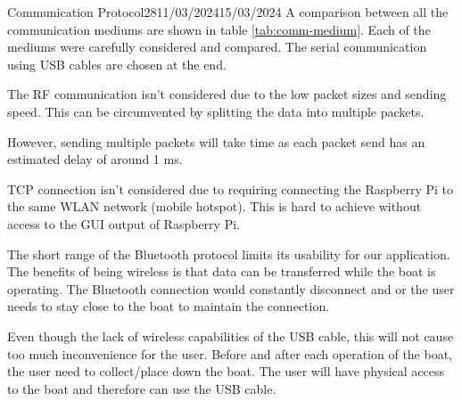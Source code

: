 \documentclass[12pt]{article}
\begin{document}
\begin{logbook-entry}{Communication Protocol}{28}{11/03/2024}{15/03/2024}
A comparison between all the communication mediums are shown in table \ref{tab:comm-medium}.
Each of the mediums were carefully considered and compared.
The serial communication using USB cables are chosen at the end.

The RF communication isn't considered due to the low packet sizes and sending speed.
This can be circumvented by splitting the data into multiple packets.

However, sending multiple packets will take time as each packet send has an estimated delay of around 1 ms.

TCP connection isn't considered due to requiring connecting the Raspberry Pi to the same WLAN network (mobile hotspot).
This is hard to achieve without access to the GUI output of Raspberry Pi.

The short range of the Bluetooth protocol limits its usability for our application.
The benefits of being wireless is that data can be transferred while the boat is operating.
The Bluetooth connection would constantly disconnect and or the user needs to stay close to the boat to maintain the connection.

Even though the lack of wireless capabilities of the USB cable, this will not cause too much inconvenience for the user.
Before and after each operation of the boat, the user need to collect/place down the boat.
The user will have physical access to the boat and therefore can use the USB cable.
\end{logbook-entry}
\end{document}

